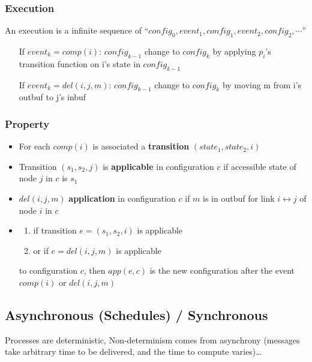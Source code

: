 \subsubsection{Execution}
An execution is a infinite sequence of \enquote{$config_0, event_1, config_1,
event_2, config_2,\cdots$}


\begin{itemize}
    \item[If] $event_k = comp(i)$: $config_{k-1}$ change to $config_k$
        by applying $p_i$'s transition function on i's state in
        $config_{k-1}$
    \item[If] $event_k = del(i, j, m)$: $config_{k-1}$ change to $config_k$
        by moving m from i's outbuf to j's inbuf
\end{itemize}


\subsubsection{Property}

\begin{itemize}
    \item For each $comp(i)$ is associated a \textbf{transition} $(state_1, state_2, i)$
    \item Transition $(s_1, s_2, j)$ is \textbf{applicable} in
        configuration $c$ if accessible state of node $j$ in $c$ is $s_1$
    \item $del(i, j, m)$ \textbf{application} in configuration $c$ if $m$ is
        in outbuf for link $i \leftrightarrow j$ of node $i$ in $c$


    \item \begin{enumerate}
            \item if transition $e=(s_1, s_2, i)$ is applicable
            \item or if $e=del(i, j, m)$ is applicable
        \end{enumerate}
        to configuration $c$, then $app(e,c)$ is the new configuration after
        the event $comp(i)$ or $del(i,j,m)$

\end{itemize}


\subsection{Asynchronous (Schedules) / Synchronous}
Processes are deterministic,
Non-determinism comes from asynchrony (messages take arbitrary time to
be delivered, and the time to compute varies)\ldots \newline

